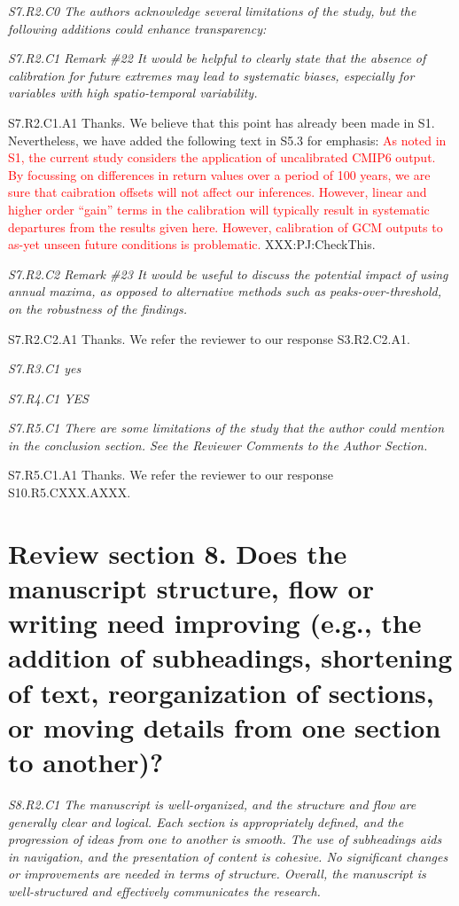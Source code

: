 \documentclass[a4paper,10pt]{article}
\newcommand{\ed}[1]{\textcolor{red}{#1}}
\begin{document}
	\emph{S7.R2.C0 The authors acknowledge several limitations of the study, but the following additions could enhance transparency:}

	\emph{S7.R2.C1 Remark \#22 It would be helpful to clearly state that the absence of calibration for future extremes may lead to systematic biases, especially for variables with high spatio-temporal variability.}

	S7.R2.C1.A1 Thanks. We believe that this point has already been made in S1. Nevertheless, we have added the following text in S5.3 for emphasis: \ed{As noted in S1, the current study considers the application of uncalibrated CMIP6 output. By focussing on differences in return values over a period of 100 years, we are sure that caibration offsets will not affect our inferences. However, linear and higher order ``gain'' terms in the calibration will typically result in systematic departures from the results given here. However, calibration of GCM outputs to as-yet unseen future conditions is problematic.} XXX:PJ:CheckThis.

	\emph{S7.R2.C2 Remark \#23 It would be useful to discuss the potential impact of using annual maxima, as opposed to alternative methods such as peaks-over-threshold, on the robustness of the findings.}

	S7.R2.C2.A1 Thanks. We refer the reviewer to our response S3.R2.C2.A1.

	\emph{S7.R3.C1 yes}

	\emph{S7.R4.C1 YES}

	\emph{S7.R5.C1 There are some limitations of the study that the author could mention in the conclusion section. See the Reviewer Comments to the Author Section.}

	S7.R5.C1.A1 Thanks. We refer the reviewer to our response S10.R5.CXXX.AXXX.

	\section*{Review section 8. Does the manuscript structure, flow or writing need improving (e.g., the addition of subheadings, shortening of text, reorganization of sections, or moving details from one section to another)?}

	\emph{S8.R2.C1 The manuscript is well-organized, and the structure and flow are generally clear and logical. Each section is appropriately defined, and the progression of ideas from one to another is smooth. The use of subheadings aids in navigation, and the presentation of content is cohesive. No significant changes or improvements are needed in terms of structure. Overall, the manuscript is well-structured and effectively communicates the research.}
	
\end{document}
